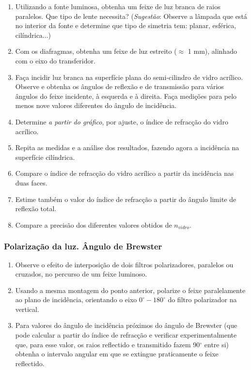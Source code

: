 \documentclass[a4paper,12pt]{article}      %
\begin{document}
\begin{enumerate}
\item Utilizando a  fonte  luminosa, obtenha  um  feixe  de  luz  branca  de  raios  paralelos. Que tipo de lente necessita? (\textit{Sugestão}: Observe a lâmpada que está no interior da fonte e determine que tipo de simetria tem: planar, esférica, cilíndrica...)
\item Com os diafragmas, obtenha um feixe de luz estreito ($\approx$ 1 mm), alinhado com o eixo do transferidor.
\item Faça  incidir  luz  branca  na  superfície  plana  do  semi-cilindro  de  vidro  acrílico.  Observe  e obtenha os ângulos de 
reflexão e de transmissão para vários ângulos do feixe incidente, à esquerda e à direita.  Faça  medições  para pelo  menos  nove  valores  diferentes  do ângulo de incidência.
\item  Determine \emph{a partir do gráfico}, por ajuste, o índice de refracção do vidro acrílico.  
\item Repita  as  medidas  e  a  análise  dos  resultados, fazendo  agora  a  incidência  na  superfície cilíndrica. 
\item  Compare o índice de refracção do vidro acrílico a partir da incidência nas duas faces. 
\item Estime também o valor do índice de refracção a partir do ângulo limite de reflexão total. 
\item  Compare a precisão dos diferentes valores obtidos de $n_{vidro}$. 
\end{enumerate}

\subsubsection{\sf Polarização da luz. Ângulo de Brewster}
\begin{enumerate}
\item Observe o efeito de interposição de dois filtros polarizadores, paralelos ou cruzados, no percurso de um feixe luminoso. 
\item Usando a mesma montagem do ponto anterior, polarize o feixe paralelamente ao plano
de incidência, orientando o eixo $0^\circ-180^\circ$ do filtro polarizador na vertical. 
\item Para valores do ângulo de incidência próximos do  ângulo  de  Brewster  (que  pode  calcular  a  partir  do  índice de refracção e verificar experimentalmente que, para esse valor, os raios reflectido e transmitido fazem 90$^\circ$ entre si) obtenha   o  intervalo angular em que se extingue praticamente o feixe reflectido. 
\end{enumerate}
\end{document}
